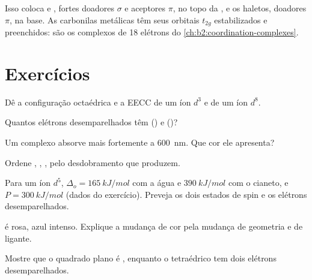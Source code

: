 Isso coloca  e , fortes doadores $\sigma$ e aceptores $\pi$, no topo
da , e os haletos, doadores $\pi$, na base. As carbonilas
metálicas têm seus orbitais $t_{2g}$ estabilizados e preenchidos: são os
complexos de 18 elétrons do \cref{ch:b2:coordination-complexes}.

\section{Exercícios}

\begin{exercise}[$\star$]\label{exo:b2:ligand-field:1}
Dê a configuração octaédrica e a EECC de um íon $d^3$ e de um íon $d^8$.
\end{exercise}

\begin{exercise}[$\star$]\label{exo:b2:ligand-field:2}
Quantos elétrons desemparelhados têm  () e
 ()?
\end{exercise}

\begin{exercise}[$\star$]\label{exo:b2:ligand-field:3}
Um complexo absorve mais fortemente a \qty{600}{nm}. Que cor ele apresenta?
\end{exercise}

\begin{exercise}[$\star$]\label{exo:b2:ligand-field:4}
Ordene , , ,  pelo desdobramento que produzem.
\end{exercise}

\begin{exercise}[$\star\star$]\label{exo:b2:ligand-field:5}
Para um íon $d^5$, $\Delta_o = \qty{165}{kJ/mol}$ com a água e $\qty{390}{kJ/mol}$ com o
cianeto, e $P = \qty{300}{kJ/mol}$ (dados do exercício). Preveja os dois estados de
spin e os elétrons desemparelhados.
\end{exercise}

\begin{exercise}[$\star\star$]\label{exo:b2:ligand-field:6}
 é rosa,  azul intenso. Explique a mudança de cor
pela mudança de geometria e de ligante.
\end{exercise}

\begin{exercise}[$\star\star$]\label{exo:b2:ligand-field:7}
Mostre que o  quadrado plano é , enquanto o
 tetraédrico tem dois elétrons desemparelhados.
\end{exercise}

